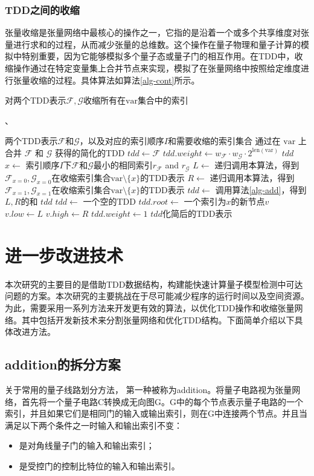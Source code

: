 \subsubsection*{TDD之间的收缩}
张量收缩是张量网络中最核心的操作之一，它指的是沿着一个或多个共享维度对张量进行求和的过程，从而减少张量的总维数。这个操作在量子物理和量子计算的模拟中特别重要，因为它能够模拟多个量子态或量子门的相互作用。在TDD中，收缩操作通过在特定变量集上合并节点来实现，模拟了在张量网络中按照给定维度进行张量收缩的过程。具体算法如算法\ref{alg-cont}所示。
\begin{algorithm}
\caption{对两个TDD表示\(\mathcal{F}, \mathcal{G}\)收缩所有在\(\text{var}\)集合中的索引}、
\label{alg-cont}
\begin{algorithmic}[1]
\Require 两个TDD表示\(\mathcal{F}\)和\(\mathcal{G}\)，以及对应的索引顺序\(I\)和需要收缩的索引集合
\Ensure 通过在 $\text{var}$ 上合并 \(\mathcal{F}\) 和 \(\mathcal{G}\) 获得的简化的TDD
    \State \(tdd \gets \mathcal{F}\)
    \State \(tdd.weight \gets w_{\mathcal{F}} \cdot w_{\mathcal{G}} \cdot 2^{\text{len}(\text{var})}\)
    \State \Return \(tdd\)
\EndIf
\State \(x \gets\) 索引顺序\(I\)下\(\mathcal{F}\)和\(\mathcal{G}\)最小的相同索引\(r_{\mathcal{F}}\) and \(r_{\mathcal{G}}\)
\State \(L \gets \) 递归调用本算法，得到\(\mathcal{F}_{x=0}, \mathcal{G}_{x=0}\)在收缩索引集合\(\text{var}\setminus\{x\}\)的TDD表示
\State \(R \gets \) 递归调用本算法，得到\(\mathcal{F}_{x=1}, \mathcal{G}_{x=1}\)在收缩索引集合\(\text{var}\setminus\{x\}\)的TDD表示
    \State \(tdd \gets\) 调用算法\ref{alg-add}，得到\(L, R\)的和
    \State \Return $tdd$
\Else
    \State \(tdd \gets\) 一个空的TDD
    \State \(tdd.root \gets\) 一个索引为\(x\)的新节点\(v\)
    \State \(v.low \gets L\)
    \State \(v.high \gets R\)
    \State \(tdd.weight \gets 1\)
    \State \Return \(tdd\)化简后的TDD表示
\EndIf
\end{algorithmic}
\end{algorithm}
\section{进一步改进技术}
本次研究的主要目的是借助TDD数据结构，构建能快速计算量子模型检测中可达问题的方案。本次研究的主要挑战在于尽可能减少程序的运行时间以及空间资源。为此，需要采用一系列方法来开发更有效的算法，以优化TDD操作和收缩张量网络。其中包括开发新技术来分割张量网络和优化TDD结构。下面简单介绍以下具体改进方法。

\subsection*{addition的拆分方案}
\label{addition}关于常用的量子线路划分方法，
第一种被称为addition\citep{chen2018classical}。将量子电路视为张量网络，首先将一个量子电路C转换成无向图G。G中的每个节点表示量子电路的一个索引，并且如果它们是相同门的输入或输出索引，则在G中连接两个节点。并且当满足以下两个条件之一时输入和输出索引不变：
\begin{itemize}
	\item 是对角线量子门的输入和输出索引；
	\item 是受控门的控制比特位的输入和输出索引。
\end{itemize}
	
